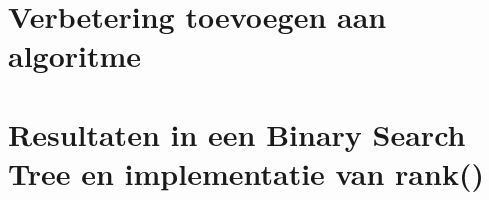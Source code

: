 \documentclass[12pt,notitlepage]{article}
\begin{document}
\section{Verbetering toevoegen aan algoritme}

\section{Resultaten in een Binary Search Tree en implementatie van rank()}
\end{document}
